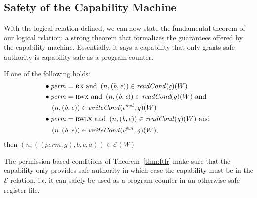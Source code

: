 \documentclass[format=acmsmall, review=false, screen=true]{acmart}
\newcommand{\var}[1]{\mathit{#1}}
\newcommand{\gl}{\var{g}}
\newcommand{\addr}{\var{a}}
\newcommand{\start}{\var{b}}
\newcommand{\addrend}{\var{e}}
\newcommand{\perm}{\var{perm}}
\newcommand{\nwl}{\var{nwl}}
\newcommand{\pwl}{\var{pwl}}
\newcommand{\plainfun}[2]{
  \ifthenelse{\equal{#2}{}}
  {\mathit{#1}}
  {\mathit{#1}(#2)}
}
\newcommand{\readCond}[1]{\plainfun{readCond}{#1}}
\newcommand{\writeCond}[1]{\plainfun{writeCond}{#1}}
\newcommand{\asmType}{\plaindom{AsmType}}
\newcommand{\plaindom}[1]{\mathrm{#1}}
\newcommand{\intr}[2]{\mathcal{#1}}
\newcommand{\exprintr}[1]{\intr{E}{#1}}
\newcommand{\stder}{\exprintr{\asmType}}
\newcommand{\npair}[2][n]{\left(#1,#2 \right)}
\newcommand{\plainperm}[1]{\textsc{#1}}
\newcommand{\exec}{\plainperm{rx}}
\newcommand{\rwx}{\plainperm{rwx}}
\newcommand{\rwlx}{\plainperm{rwlx}}
\begin{document}
\subsection{Safety of the Capability Machine}
With the logical relation defined, we can now state the fundamental theorem of
our logical relation: a strong theorem that formalizes the guarantees offered by
the capability machine. Essentially, it says a capability that only grants safe
authority is capability safe as a program counter.
\begin{theorem}
  \label{thm:ftlr}
  If one of the following holds:
  \begin{align*}
      & \bullet
        \begin{aligned}[t]
        &\perm = \exec \text{ and }\npair{(\start,\addrend)} \in \readCond{}(\gl)(W)
      \end{aligned} \\
    & \bullet 
      \begin{aligned}[t]
        &\perm = \rwx \text{ and } \npair{(\start,\addrend)} \in \readCond{}(\gl)(W) \text{ and }\\
        &\npair{(\start,\addrend)} \in \writeCond{}(\iota^\nwl,\gl)(W)
      \end{aligned} \\
    & \bullet 
      \begin{aligned}[t]
        &\perm = \rwlx \text{ and }\npair{(\start,\addrend)} \in \readCond{}(\gl)(W) \text{ and }\\
        &\npair{(\start,\addrend)} \in \writeCond{}(\iota^\pwl,\gl)(W),
      \end{aligned}
  \end{align*}
  then $\npair{((\perm,\gl),\start,\addrend,\addr)} \in \stder(W)$
\end{theorem}
The permission-based conditions of Theorem~\ref{thm:ftlr} make sure that the
capability only provides safe authority in which case the capability must be in
the $\stder$ relation, i.e. it can safely be used as a program counter in an
otherwise safe register-file.
\end{document}
